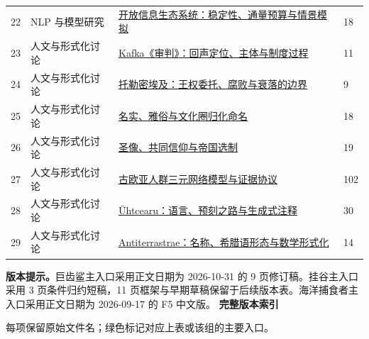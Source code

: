 \documentclass[UTF8,fontset=fandol,10pt,a4paper]{ctexart}
\begin{document}
\begin{longtable}{@{}R{7mm}L{25mm}L{\dimexpr\linewidth-43mm-6\tabcolsep\relax}R{11mm}@{}}
22 & NLP 与模型研究 & \href{https://chatgpt.com/library?file_id=libfile_fdf52cb04a50819198825e614b1e08a0&account_id=personal}{开放信息生态系统：稳定性、通量预算与情景模拟} & 18 \\
23 & 人文与形式化讨论 & \href{https://chatgpt.com/library?file_id=libfile_d74f06924a9881919e74147105b35e25&account_id=personal}{Kafka《审判》：回声定位、主体与制度过程} & 11 \\
24 & 人文与形式化讨论 & \href{https://chatgpt.com/library?file_id=libfile_597771b2a3a08191a811ccd59610c030&account_id=personal}{托勒密埃及：王权委托、腐败与衰落的边界} & 9 \\
25 & 人文与形式化讨论 & \href{https://chatgpt.com/library?file_id=libfile_a8991941652081918c27b74f0eadfc15&account_id=personal}{名实、雅俗与文化圈归化命名} & 18 \\
26 & 人文与形式化讨论 & \href{https://chatgpt.com/library?file_id=libfile_df6b42088d908191b74d49f9f1ef3540&account_id=personal}{圣像、共同信仰与帝国选制} & 19 \\
27 & 人文与形式化讨论 & \href{https://chatgpt.com/library?file_id=libfile_821edabfde208191b4610fd0f97345dc&account_id=personal}{古欧亚人群三元网络模型与证据协议} & 102 \\
28 & 人文与形式化讨论 & \href{https://chatgpt.com/library?file_id=libfile_1ad8e27d96cc81918514bf743a183f30&account_id=personal}{Ūhtcearu：语言、预刻之路与生成式注释} & 30 \\
29 & 人文与形式化讨论 & \href{https://chatgpt.com/library?file_id=libfile_def8bb5116d481919b51486807d4b43d&account_id=personal}{Antiterrastrae：名称、希腊语形态与数学形式化} & 14 \\
\end{longtable}
\endgroup
\vspace{1mm}
{\small\textbf{版本提示。}巨齿鲨主入口采用正文日期为 2026-10-31 的 9 页修订稿。挂谷主入口采用 3 页条件归约短稿，11 页框架与早期草稿保留于后续版本表。海洋捕食者主入口采用正文日期为 2026-09-17 的 F5 中文版。}
\Needspace{60mm}\vspace{4mm}
{\Large\bfseries\color{Ink}完整版本索引}\par
{\small 每项保留原始文件名；绿色标记对应上表或该组的主要入口。}
\Needspace{55mm}
\end{document}
